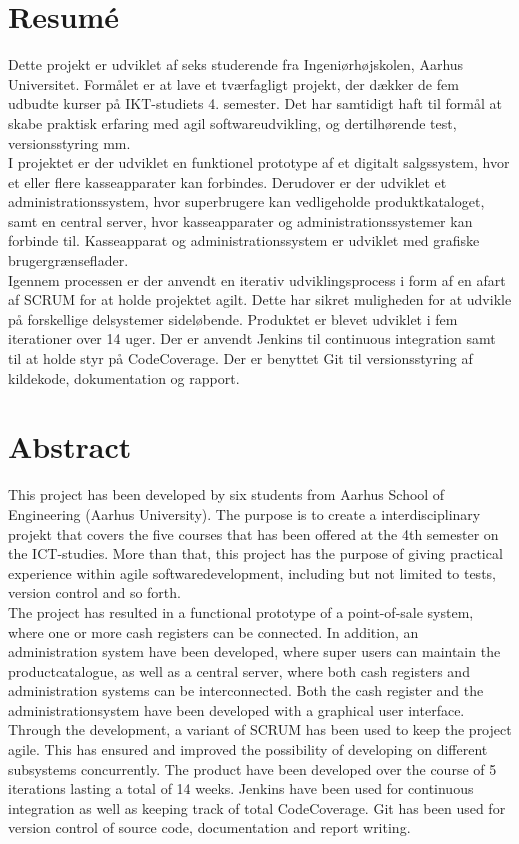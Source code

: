 \section*{Resumé}
Dette projekt er udviklet af seks studerende fra Ingeniørhøjskolen, Aarhus Universitet. Formålet er at lave et tværfagligt projekt, der dækker de fem udbudte kurser på IKT-studiets 4. semester. Det har samtidigt haft til formål at skabe praktisk erfaring med agil softwareudvikling, og dertilhørende test, versionsstyring mm.\\

I projektet er der udviklet en funktionel prototype af et digitalt salgssystem, hvor et eller flere kasseapparater kan forbindes. Derudover er der udviklet et administrationssystem, hvor superbrugere kan vedligeholde produktkataloget, samt en central server, hvor kasseapparater og administrationssystemer kan forbinde til. Kasseapparat og administrationssystem er udviklet med grafiske brugergrænseflader.\\

Igennem processen er der anvendt en iterativ udviklingsprocess i form af en afart af SCRUM for at holde projektet agilt. Dette har sikret muligheden for at udvikle på forskellige delsystemer sideløbende. Produktet er blevet udviklet i fem iterationer over 14 uger. Der er anvendt Jenkins til continuous integration samt til at holde styr på CodeCoverage. Der er benyttet Git til versionsstyring af kildekode, dokumentation og rapport. \\


\section*{Abstract}
This project has been developed by six students from Aarhus School of Engineering (Aarhus University). The purpose is to create a interdisciplinary projekt that covers the five courses that has been offered at the 4th semester on the ICT-studies. More than that, this project has the purpose of giving practical experience within agile softwaredevelopment, including but not limited to tests, version control and so forth.\\

The project has resulted in a functional prototype of a point-of-sale system, where one or more cash registers can be connected. In addition, an administration system have been developed, where super users can maintain the productcatalogue, as well as a central server, where both cash registers and administration systems can be interconnected. Both the cash register and the administrationsystem have been developed with a graphical user interface. \\

Through the development, a variant of SCRUM has been used to keep the project agile. This has ensured and improved the possibility of developing on different subsystems concurrently. The product have been developed over the course of 5 iterations lasting a total of 14 weeks. Jenkins have been used for continuous integration as well as keeping track of total CodeCoverage. Git has been used for version control of source code, documentation and report writing. \\
